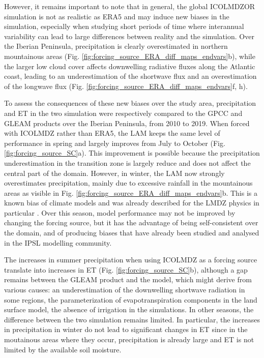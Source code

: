 \hfill

However, it remains important to note that in general, the global ICOLMDZOR simulation is not as realistic as ERA5 and may induce new biases in the simulation, especially when studying short periods of time where interannual variability can lead to large differences between reality and the simulation. 
Over the Iberian Peninsula, precipitation is clearly overestimated in northern mountainous areas (Fig. \ref{fig:forcing_source_ERA_diff_maps_endvars}b), while the larger low cloud cover affects downwelling radiative fluxes along the Atlantic coast, leading to an underestimation of the shortwave flux and an overestimation of the longwave flux (Fig. \ref{fig:forcing_source_ERA_diff_maps_endvars}f, h).

To assess the consequences of these new biases over the study area, precipitation and ET in the two simulation were respectively compared to the GPCC and GLEAM products over the Iberian Peninsula, from 2010 to 2019.
When forced with ICOLMDZ rather than ERA5, the LAM keeps the same level of performance in spring and largely improves from July to October (Fig. \ref{fig:forcing_source_SC}a). This improvement is possible because the precipitation underestimation in the transition zone is largely reduce and does not affect the central part of the domain. However, in winter, the LAM now strongly overestimates precipitation, mainly due to excessive rainfall in the mountainous areas as visible in Fig. \ref{fig:forcing_source_ERA_diff_maps_endvars}b. This is a known bias of climate models and was already described for the LMDZ physics in particular \citep{arjdal_modeling_2024, adhikari_evaluation_2024}. Over this season, model performance may not be improved by changing the forcing source, but it has the advantage of being self-consistent over the domain, and of producing biases that have already been studied and analysed in the IPSL modelling community.

The increases in summer precipitation when using ICOLMDZ as a forcing source translate into increases in ET (Fig. \ref{fig:forcing_source_SC}b), although a gap remains between the GLEAM product and the model, which might derive from various causes: an underestimation of the downwelling shortwave radiation in some regions, the parameterization of evapotranspiration components in the land surface model, the absence of irrigation in the simulations. In other seasons, the difference between the two simulation remains limited. In particular, the increases in precipitation in winter do not lead to significant changes in ET since in the moutainous areas where they occur, precipitation is already large and ET is not limited by the available soil moisture.

